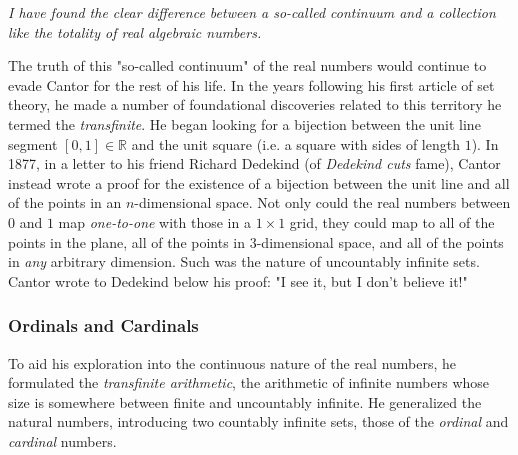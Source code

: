 \begin{displayquote}
	\textit{I have found the clear difference between a so-called continuum and a collection like the totality of real algebraic numbers.}
	\vspace{4mm}
\end{displayquote}

The truth of this "so-called continuum" of the real numbers would continue to evade Cantor for the rest of his life. In the years following his first article of set theory, he made a number of foundational discoveries related to this territory he termed the \textit{transfinite}. He began looking for a bijection between the unit line segment $[0,1]\in\mathbb{R}$ and the unit square (i.e. a square with sides of length $1$). In 1877, in a letter to his friend Richard Dedekind (of \textit{Dedekind cuts} fame), Cantor instead wrote a proof for the existence of a bijection between the unit line and all of the points in an $n$-dimensional space. Not only could the real numbers between $0$ and $1$ map \textit{one-to-one} with those in a $1\times1$ grid, they could map to all of the points in the plane, all of the points in 3-dimensional space, and all of the points in \textit{any} arbitrary dimension. Such was the nature of uncountably infinite sets. Cantor wrote to Dedekind below his proof: "I see it, but I don't believe it!" \\

\subsubsection{Ordinals and Cardinals}

To aid his exploration into the continuous nature of the real numbers, he formulated the \textit{transfinite arithmetic}, the arithmetic of infinite numbers whose size is somewhere between finite and uncountably infinite. He generalized the natural numbers, introducing two countably infinite sets, those of the \textit{ordinal} and \textit{cardinal} numbers. \\

